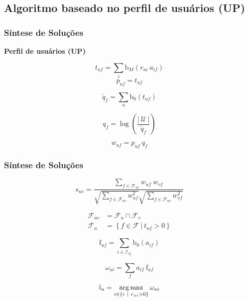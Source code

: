 \subsection{Algoritmo baseado no perfil de usuários (UP)} %
\label{sec:algoritmo_baseado_no_perfil_de_usu_rios_}


\begin{frame}
\frametitle{Síntese de Soluções}
\textbf{Perfil de usuários (UP)}

\begin{equation}
\label{eq:puf} 
    t_{uf} = \sum_{i}{\mathrm{b}_M\left(r_{ui}~a_{if}\right)} 
\end{equation} 
\begin{equation}
\label{eq:tf} 
    p_{uf} = t_{uf}
\end{equation} 

\begin{equation}
\label{eq:uf} 
    \check{q}_{f} = \sum_{u}{\mathrm{b}_0\left(t_{uf}\right)}
\end{equation} 

\begin{equation}
\label{eq:iuf} 
    q_{f} = \log \left( \frac{\left|~\mathcal{U}~\right|}{\check{q}_{f}} \right)
\end{equation} 


\begin{equation}
\label{eq:w-tfidf} 
    w_{uf} = p_{uf}~q_{f}
\end{equation} 

\end{frame}


\begin{frame}
\frametitle{Síntese de Soluções}
\begin{equation}
\label{eq:suv}
    s_{uv} = \frac{\sum\limits_{f \in \mathcal{F}_{uv}}{w_{uf}~w_{vf}}}{\sqrt{\sum\limits_{f \in \mathcal{F}_{uv}
    }w_{uf}^2} \sqrt{\sum\limits_{f \in \mathcal{F}_{uv}}w_{vf}^2}} 
\end{equation} 

\begin{equation}
\label{eq:fuv}
\begin{split}
    \mathcal{F}_{uv} &= \mathcal{F}_u \cap \mathcal{F}_v \\
    \mathcal{F}_u &= \left\{ f \in \mathcal{F}~|~t_{uf} > 0 \right\}
\end{split}    
\end{equation} 



\begin{equation}
\label{eq:frf} 
\mathrm{f}_{uf} = \sum_{i \in \mathcal{I}_{v_k^u}}{\mathrm{b}_0\left(a_{if}\right)}
\end{equation} 


\begin{equation}
\label{eq:wi} 
    \omega_{ui} = \sum_{f}{a_{if}~\mathrm{f}_{uf}}
\end{equation} 

\begin{equation}
\label{eq:iup} 
    \hat{\imath}_u = \operatorname*{arg\,max}_{i \in \left\{i~|~r_{ui} > 0\right\}}{\omega_{ui}}
\end{equation} 
\end{frame}



